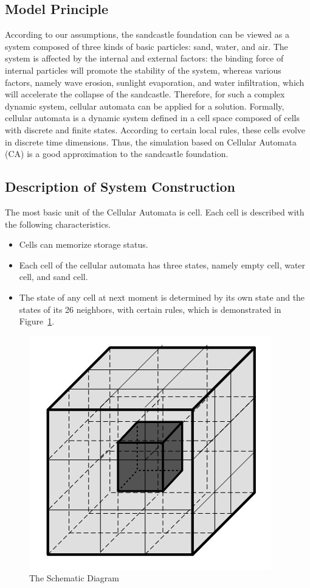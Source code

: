 \documentclass{mcmthesis}		    %
\begin{document}
\subsection{Model Principle}
    According to our assumptions, the sandcastle foundation can be viewed as a system composed of three kinds of basic particles: sand, water, and air. The system is affected by the internal and external factors: the binding force of internal particles will promote the stability of the system, whereas various factors, namely wave erosion, sunlight evaporation, and water infiltration, which will accelerate the collapse of the sandcastle. Therefore, for such a complex dynamic system, cellular automata can be applied for a solution. Formally, cellular automata is a dynamic system defined in a cell space composed of cells with discrete and finite states. According to certain local rules, these cells evolve in discrete time dimensions. Thus, the simulation based on Cellular Automata (CA) is a good approximation to the sandcastle foundation.
	
	\subsection{Description of System Construction}
    The most basic unit of the Cellular Automata is cell. Each cell is described with the following characteristics. 
 	\begin{itemize}
	    
	    \item  Cells can memorize storage status.
	  
       \item Each cell of the cellular automata has three states, namely empty cell, water cell, and sand cell.
	    
 	    \item The state of any cell at next moment is determined by its own state and the states of its 26 neighbors, with certain rules, which is demonstrated in Figure~\ref{fig:The Schematic Diagram}.

 	\end{itemize}

	\begin{figure}[htbp!]
		\centering
		\includegraphics[width=0.25\columnwidth]{The Schematic Diagram.jpg}
		\caption{The Schematic Diagram}
		\label{fig:The Schematic Diagram}
	\end{figure}
	
\end{document}
